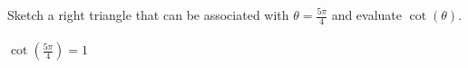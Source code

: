 {Sketch a right triangle that can be associated with $\theta = \frac{5\pi}{4}$ and evaluate $\cot{(\theta)}$.}
{\text{}\\ \label{fig:03_05_ex_13}\\
$\cot{(\frac{5\pi}{4})} =1$}

